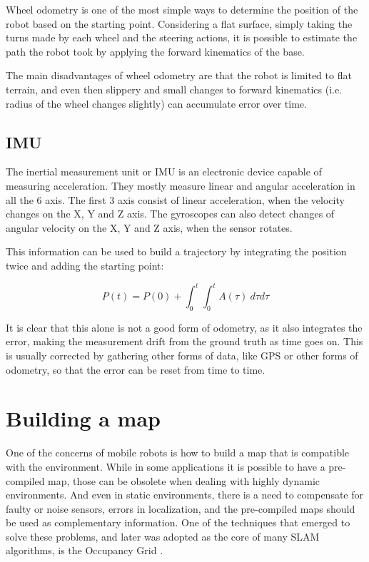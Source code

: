Wheel odometry is one of the most simple ways to determine the position of the robot based on the starting point. Considering a flat surface, simply taking the turns made by each wheel and the steering actions, it is possible to estimate the path the robot took by applying the forward kinematics of the base.

The main disadvantages of wheel odometry are that the robot is limited to flat terrain, and even then slippery and small changes to forward kinematics (i.e. radius of the wheel changes slightly) can accumulate error over time.

\subsection{IMU}

The inertial measurement unit or IMU is an electronic device capable of measuring acceleration. They mostly measure linear and angular acceleration in all the 6 axis. The first 3 axis consist of linear acceleration, when the velocity changes on the X, Y and Z axis. The gyroscopes can also detect changes of angular velocity on the X, Y and Z axis, when the sensor rotates.

This information can be used to build a trajectory by integrating the position twice and adding the starting point:

\begin{equation}
P(t) = P(0) + \int_0^t \int_0^t A(\tau) \ d\tau d\tau
\end{equation}

It is clear that this alone is not a good form of odometry, as it also integrates the error, making the measurement drift from the ground truth as time goes on. This is usually corrected by gathering other forms of data, like GPS or other forms of odometry, so that the error can be reset from time to time.

\section{Building a map}

One of the concerns of mobile robots is how to build a map that is compatible with the environment. While in some applications it is possible to have a pre-compiled map, those can be obsolete when dealing with highly dynamic environments. And even in static environments, there is a need to compensate for faulty or noise sensors, errors in localization, and the pre-compiled maps should be used as complementary information. One of the techniques that emerged to solve these problems, and later was adopted as the core of many SLAM algorithms, is the Occupancy Grid \cite{elfes1989using}.

